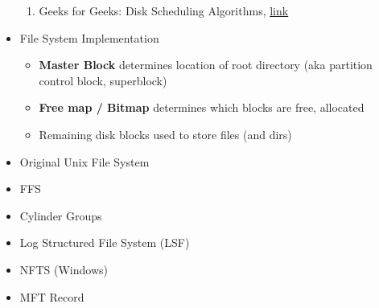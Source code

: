 \documentclass[12pt]{article}
\begin{document}
\begin{itemize}
    \begin{enumerate}[1)]
        \item Geeks for Geeks: Disk Scheduling Algorithms, \href{https://www.geeksforgeeks.org/disk-scheduling-algorithms/}{link}
    \end{enumerate}
    \item File System Implementation
    \begin{itemize}
        \item \textbf{Master Block} determines location of root directory
        (aka partition control block, superblock)
        \item \textbf{Free map / Bitmap} determines which blocks are free, allocated
        \item Remaining disk blocks used to store files (and dirs)
    \end{itemize}
    \item Original Unix File System
    \item FFS
    \item Cylinder Groups
    \item Log Structured File System (LSF)
    \item NFTS (Windows)
    \item MFT Record
\end{itemize}
\end{document}
